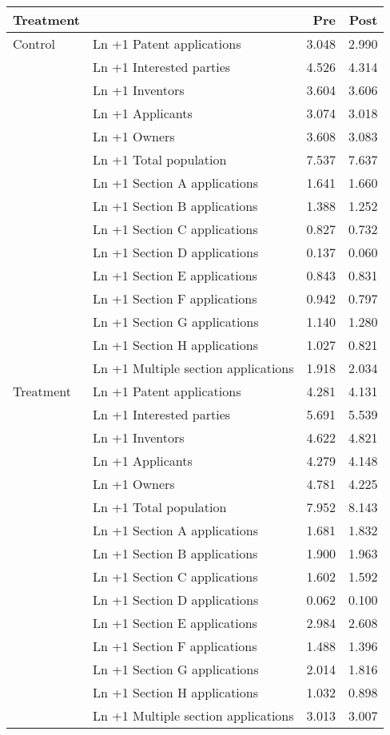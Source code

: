 
\begin{tabular}[t]{llrr}
\toprule
Treatment &   & Pre & Post\\
\midrule
Control & Ln +1 Patent applications & \num{3.048} & \num{2.990}\\
 & Ln +1 Interested parties & \num{4.526} & \num{4.314}\\
 & Ln +1 Inventors & \num{3.604} & \num{3.606}\\
 & Ln +1 Applicants & \num{3.074} & \num{3.018}\\
 & Ln +1 Owners & \num{3.608} & \num{3.083}\\
 & Ln +1 Total population & \num{7.537} & \num{7.637}\\
 & Ln +1 Section A applications & \num{1.641} & \num{1.660}\\
 & Ln +1 Section B applications & \num{1.388} & \num{1.252}\\
 & Ln +1 Section C applications & \num{0.827} & \num{0.732}\\
 & Ln +1 Section D applications & \num{0.137} & \num{0.060}\\
 & Ln +1 Section E applications & \num{0.843} & \num{0.831}\\
 & Ln +1 Section F applications & \num{0.942} & \num{0.797}\\
 & Ln +1 Section G applications & \num{1.140} & \num{1.280}\\
 & Ln +1 Section H applications & \num{1.027} & \num{0.821}\\
 & Ln +1 Multiple section applications & \num{1.918} & \num{2.034}\\
Treatment & Ln +1 Patent applications & \num{4.281} & \num{4.131}\\
 & Ln +1 Interested parties & \num{5.691} & \num{5.539}\\
 & Ln +1 Inventors & \num{4.622} & \num{4.821}\\
 & Ln +1 Applicants & \num{4.279} & \num{4.148}\\
 & Ln +1 Owners & \num{4.781} & \num{4.225}\\
 & Ln +1 Total population & \num{7.952} & \num{8.143}\\
 & Ln +1 Section A applications & \num{1.681} & \num{1.832}\\
 & Ln +1 Section B applications & \num{1.900} & \num{1.963}\\
 & Ln +1 Section C applications & \num{1.602} & \num{1.592}\\
 & Ln +1 Section D applications & \num{0.062} & \num{0.100}\\
 & Ln +1 Section E applications & \num{2.984} & \num{2.608}\\
 & Ln +1 Section F applications & \num{1.488} & \num{1.396}\\
 & Ln +1 Section G applications & \num{2.014} & \num{1.816}\\
 & Ln +1 Section H applications & \num{1.032} & \num{0.898}\\
 & Ln +1 Multiple section applications & \num{3.013} & \num{3.007}\\
\bottomrule
\end{tabular}
